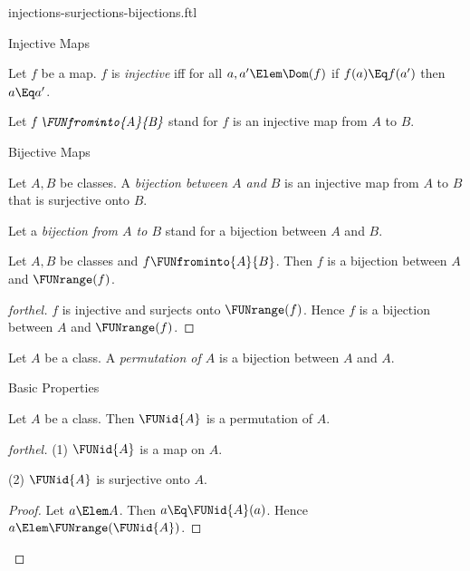 \documentclass{stex}
\begin{document}
\begin{smodule}{injections-surjections-bijections.ftl}
\begin{sfragment}{Injective Maps}
  \begin{definition}[forthel,id=FOUNDATIONS_08_605931408719872]
    Let $f$ be a map.
    $f$ is \emph{injective} iff for all $a, a' \Elem \Dom(f)$ if $f(a) \Eq f(a')$ then $a \Eq a'$.

    Let $\emph{f \FUNfrominto{A}{B}}$ stand for $f$ is an injective map from $A$ to $B$.
  \end{definition}
\end{sfragment}

\begin{sfragment}{Bijective Maps}
  \begin{definition}[forthel,id=FOUNDATIONS_08_3356670992318464]
    Let $A, B$ be classes.
    A \emph{bijection between $A$ and $B$} is an injective map from $A$ to $B$ that is surjective onto $B$.

    Let a \emph{bijection from $A$ to $B$} stand for a bijection between $A$ and $B$.
  \end{definition}

  \begin{proposition}[forthel,id=FOUNDATIONS_08_60881194975232]
    Let $A, B$ be classes and $f \FUNfrominto{A}{B}$.
    Then $f$ is a bijection between $A$ and $\FUNrange(f)$.
  \end{proposition}
  \begin{proof}[forthel]
    $f$ is injective and surjects onto $\FUNrange(f)$.
    Hence $f$ is a bijection between $A$ and $\FUNrange(f)$.
  \end{proof}

  \begin{definition}[forthel,id=FOUNDATIONS_08_8188451318923264]
    Let $A$ be a class.
    A \emph{permutation of $A$} is a bijection between $A$ and $A$.
  \end{definition}
\end{sfragment}

\begin{sfragment}{Basic Properties}
  \begin{proposition}[forthel,id=FOUNDATIONS_08_7883784041005056]
    Let $A$ be a class.
    Then $\FUNid{A}$ is a permutation of $A$.
  \end{proposition}
  \begin{proof}[forthel]
    (1) $\FUNid{A}$ is a map on $A$.

    (2) $\FUNid{A}$ is surjective onto $A$.
    \begin{proof}
      Let $a \Elem A$.
      Then $a \Eq \FUNid{A}(a)$.
      Hence $a \Elem \FUNrange(\FUNid{A})$.
    \end{proof}


\end{proof}
\end{sfragment}
\end{smodule}
\end{document}
